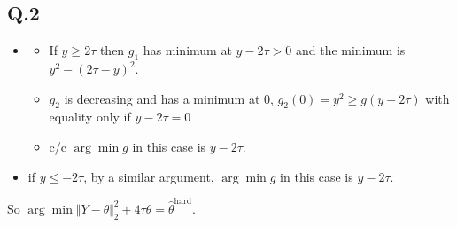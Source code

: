 \documentclass[12pt]{article}
\newcommand{\Q}[1]{\subsection*{Q.#1}}
\newenvironment{question}[1]
{\Q{#1}}{}
\begin{document}
\begin{question}{2}
\begin{itemize}
\begin{itemize}
  \item
    \begin{itemize}
    \item If $y \ge 2\tau$ then $g_1$ has minimum at $y - 2\tau > 0$  and the minimum is $ y^2 - (2\tau-y)^2$.
    \item   $g_2$ is decreasing  and has a minimum at 0, $g_2(0) = y^2 \ge g(y-2\tau)$ with equality only if $y-2\tau = 0$
    \item c/c  $\arg\min g$ in this case is $y - 2\tau$.
    \end{itemize}

  \item if $y \le -2\tau$, by a similar argument, $\arg\min g$ in this
    case is $y - 2\tau$.
  \end{itemize}
  
  So
  $\arg\min \Vert Y - \theta\Vert _2^2 + 4\tau \theta = \hat
  \theta^{\text{hard}}$.
\end{itemize}
\end{question}
\end{document}
